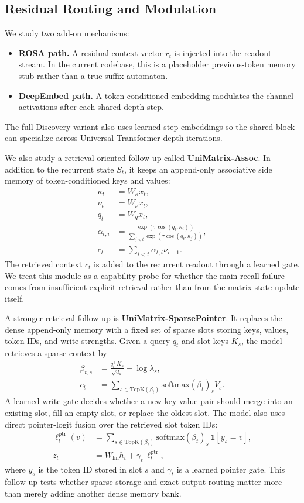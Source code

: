 \documentclass[11pt]{article}
\begin{document}
\subsection{Residual Routing and Modulation}
We study two add-on mechanisms:
\begin{itemize}[leftmargin=1.25em]
  \item \textbf{ROSA path.} A residual context vector $r_t$ is injected into
  the readout stream. In the current codebase, this is a placeholder
  previous-token memory stub rather than a true suffix automaton.
  \item \textbf{DeepEmbed path.} A token-conditioned embedding modulates the
  channel activations after each shared depth step.
\end{itemize}
The full Discovery variant also uses learned step embeddings so the shared
block can specialize across Universal Transformer depth iterations.

We also study a retrieval-oriented follow-up called
\textbf{UniMatrix-Assoc}. In addition to the recurrent state $S_t$, it keeps an
append-only associative side memory of token-conditioned keys and values:
\begin{align}
\kappa_t &= W_{\kappa} x_t, \\
\nu_t &= W_{\nu} x_t, \\
q_t &= W_q x_t, \\
\alpha_{t,i} &= \frac{\exp\left(\tau \cos(q_t, \kappa_i)\right)}
{\sum_{j<t} \exp\left(\tau \cos(q_t, \kappa_j)\right)}, \\
c_t &= \sum_{i<t} \alpha_{t,i} \nu_{i+1}.
\end{align}
The retrieved context $c_t$ is added to the recurrent readout through a learned
gate. We treat this module as a capability probe for whether the main recall
failure comes from insufficient explicit retrieval rather than from the
matrix-state update itself.

A stronger retrieval follow-up is \textbf{UniMatrix-SparsePointer}. It replaces
the dense append-only memory with a fixed set of sparse slots storing keys,
values, token IDs, and write strengths. Given a query $q_t$ and slot keys
$K_s$, the model retrieves a sparse context by
\begin{align}
\beta_{t,s} &= \frac{q_t^\top K_s}{\sqrt{d_k}} + \log \lambda_s, \\
c_t &= \sum_{s \in \mathrm{TopK}(\beta_t)} \mathrm{softmax}(\beta_t)_s V_s.
\end{align}
A learned write gate decides whether a new key-value pair should merge into an
existing slot, fill an empty slot, or replace the oldest slot. The model also
uses direct pointer-logit fusion over the retrieved slot token IDs:
\begin{align}
\ell_t^{\text{ptr}}(v) &= \sum_{s \in \mathrm{TopK}(\beta_t)}
\mathrm{softmax}(\beta_t)_s \,\mathbf{1}[y_s = v], \\
z_t &= W_{\text{lm}} h_t + \gamma_t \,\ell_t^{\text{ptr}},
\end{align}
where $y_s$ is the token ID stored in slot $s$ and $\gamma_t$ is a learned
pointer gate. This follow-up tests whether sparse storage and exact output
routing matter more than merely adding another dense memory bank.
\end{document}

